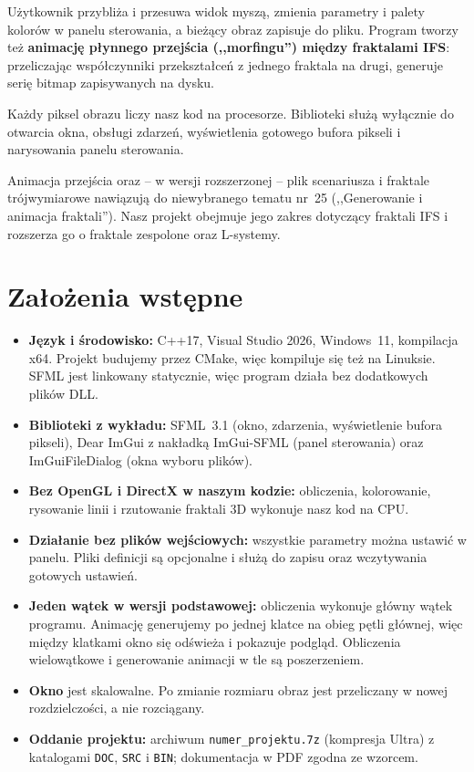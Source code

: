 \documentclass[11pt,a4paper]{article}
\newcommand{\kod}[1]{\texttt{#1}}
\begin{document}
Użytkownik przybliża i przesuwa widok myszą, zmienia parametry i palety
kolorów w panelu sterowania, a bieżący obraz zapisuje do pliku. Program
tworzy też \textbf{animację płynnego przejścia (,,morfingu'') między
fraktalami IFS}: przeliczając współczynniki przekształceń z jednego fraktala na
drugi, generuje serię bitmap zapisywanych na dysku.

Każdy piksel obrazu liczy nasz kod na procesorze. Biblioteki służą wyłącznie
do otwarcia okna, obsługi zdarzeń, wyświetlenia gotowego bufora pikseli
i narysowania panelu sterowania.

Animacja przejścia oraz -- w wersji rozszerzonej -- plik scenariusza
i fraktale trójwymiarowe nawiązują do niewybranego tematu nr~25 (,,Generowanie
i animacja fraktali''). Nasz projekt obejmuje jego zakres dotyczący fraktali
IFS i rozszerza go o fraktale zespolone oraz L-systemy.

\section{Założenia wstępne}

\begin{itemize}
  \item \textbf{Język i środowisko:} C++17, Visual Studio 2026, Windows~11,
        kompilacja x64. Projekt budujemy przez CMake, więc kompiluje się też
        na Linuksie. SFML jest linkowany statycznie, więc program działa bez
        dodatkowych plików DLL.
  \item \textbf{Biblioteki z wykładu:} SFML~3.1 (okno, zdarzenia, wyświetlenie
        bufora pikseli), Dear ImGui z nakładką ImGui-SFML (panel sterowania)
        oraz ImGuiFileDialog (okna wyboru plików).
  \item \textbf{Bez OpenGL i DirectX w naszym kodzie:} obliczenia, kolorowanie,
        rysowanie linii i rzutowanie fraktali 3D wykonuje nasz kod na CPU.
  \item \textbf{Działanie bez plików wejściowych:} wszystkie parametry można
        ustawić w panelu. Pliki definicji są opcjonalne i służą do zapisu oraz
        wczytywania gotowych ustawień.
  \item \textbf{Jeden wątek w wersji podstawowej:} obliczenia wykonuje główny
        wątek programu. Animację generujemy po jednej klatce na obieg pętli
        głównej, więc między klatkami okno się odświeża i pokazuje podgląd.
        Obliczenia wielowątkowe i generowanie animacji w tle są poszerzeniem.
  \item \textbf{Okno} jest skalowalne. Po zmianie rozmiaru obraz jest
        przeliczany w nowej rozdzielczości, a nie rozciągany.
  \item \textbf{Oddanie projektu:} archiwum \kod{numer\_projektu.7z}
        (kompresja Ultra) z katalogami \kod{DOC}, \kod{SRC} i \kod{BIN};
        dokumentacja w PDF zgodna ze wzorcem.
\end{itemize}
\end{document}
